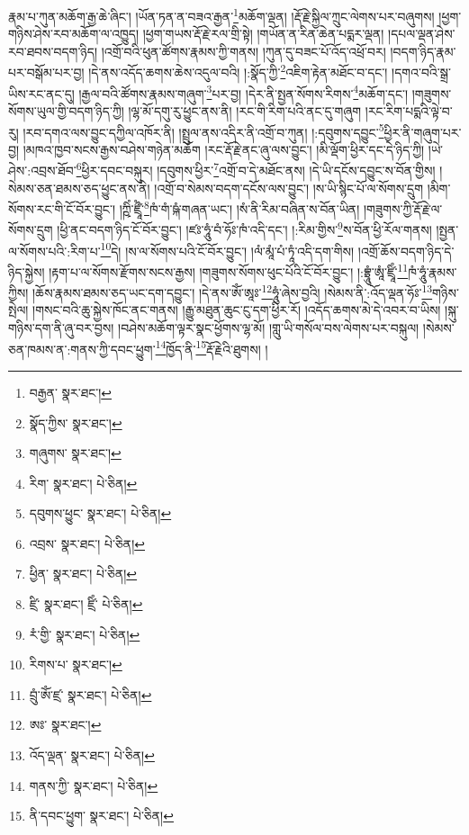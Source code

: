 རྣམ་པ་ཀུན་མཆོག་རྒྱ་ཆེ་ཞིང་། །ཡོན་ཏན་ན་བཟའ་རྒྱན་\footnote{བརྒྱན་  སྣར་ཐང་། }མཆོག་ལྡན། །རྡོ་རྗེ་སྐྱིལ་ཀྲུང་ལེགས་པར་བཞུགས། །ཕྱག་གཉིས་ཤེས་རབ་མཆོག་ལ་འཁྱུད། །ཕྱག་གཡས་རྡོ་རྗེ་རལ་གྲི་སྟེ། །གཡོན་ན་རིན་ཆེན་པདྨར་ལྡན། །དཔལ་ལྡན་ཤེས་རབ་ཐབས་བདག་ཉིད། །འགྲོ་བའི་ཕུན་ཚོགས་རྣམས་ཀྱི་གནས། །ཀུན་དུ་བཟང་པོ་འོད་འཕྲོ་བར། །བདག་ཉིད་རྣམ་པར་བསྒོམ་པར་བྱ། །དེ་ནས་འདོད་ཆགས་ཆེས་འདུལ་བའི། །:སྣོད་ཀྱི་\footnote{སྣོད་ཀྱིས་  སྣར་ཐང་། }འཇིག་རྟེན་མཐོང་བ་དང་། །དགའ་བའི་སྒྲ་ཡིས་རང་ནང་དུ། །རྒྱལ་བའི་ཚོགས་རྣམས་གཞུག་\footnote{གཞུགས་  སྣར་ཐང་། }པར་བྱ། །དེར་ནི་སྤྱན་སོགས་རིགས་\footnote{རིག་  སྣར་ཐང་།  པེ་ཅིན། }མཆོག་དང་། །གཟུགས་སོགས་ཡུལ་གྱི་བདག་ཉིད་ཀྱི། །ལྷ་མོ་དགུ་རུ་ཕྱུང་ནས་ནི། །རང་གི་རིག་པའི་ནང་དུ་གཞུག །རང་རིག་པདྨའི་ལྟེ་བ་རུ། །རབ་དགའ་ལས་བྱུང་དཀྱིལ་འཁོར་ནི། །སྤྲུལ་ནས་འདིར་ནི་འགྲོ་བ་ཀུན། །:དབུགས་དབྱུང་\footnote{དབུགས་ཕྱུང་  སྣར་ཐང་།  པེ་ཅིན། }ཕྱིར་ནི་གཞུག་པར་བྱ། །མཁའ་ཁྱབ་སངས་རྒྱས་བཤེས་གཉེན་མཆོག །རང་རྡོ་རྗེ་ནང་ཞུ་ལས་བྱུང་། །མི་ལྡོག་ཕྱིར་དང་དེ་ཉིད་ཀྱི། །ཡེ་ཤེས་:འབྲས་ཐོབ་\footnote{འབྲས་  སྣར་ཐང་།  པེ་ཅིན། }ཕྱིར་དབང་བསྐུར། །དབུགས་ཕྱིར་\footnote{ཕྱིན་  སྣར་ཐང་།  པེ་ཅིན། }འགྲོ་བ་དེ་མཐོང་ནས། །དེ་ཡི་དངོས་དབྱུང་ས་བོན་གྱིས། །སེམས་ཅན་ཐམས་ཅད་ཕྱུང་ནས་ནི། །འགྲོ་བ་སེམས་བདག་དངོས་ལས་བྱུང་། །ས་ཡི་སྙིང་པོ་ལ་སོགས་དྲུག །མིག་སོགས་རང་གི་ངོ་བོར་བྱུང་། །ཀྵིཾ་ཛྲཱྀཾ་\footnote{ཛྲི་  སྣར་ཐང་། ཛྲིཾ་  པེ་ཅིན། }ཁཾ་གཾ་ཥྐཾ་གཞན་ཡང་། །སཾ་ནི་རིམ་བཞིན་ས་བོན་ཡིན། །གཟུགས་ཀྱི་རྡོ་རྗེ་ལ་སོགས་དྲུག །ཕྱི་ནང་བདག་ཉིད་ངོ་བོར་བྱུང་། །ཛཿ་ཧཱུཾ་བཾ་ཧོཿ་ཁཾ་འདི་དང་། །:རིམ་གྱིས་\footnote{རཾ་གྱི་  སྣར་ཐང་།  པེ་ཅིན། }ས་བོན་ཕྱི་རོལ་གནས། །སྤྱན་ལ་སོགས་པའི་:རིག་པ་\footnote{རིགས་པ་  སྣར་ཐང་། }དེ། །ས་ལ་སོགས་པའི་ངོ་བོར་བྱུང་། །ལཾ་མཱཾ་པཾ་ཏཱཾ་འདི་དག་གིས། །འགྲོ་ཆོས་བདག་ཉིད་དེ་ཉིད་སྐྱེས། །རྟག་པ་ལ་སོགས་རྫོགས་སངས་རྒྱས། །གཟུགས་སོགས་ཕུང་པོའི་ངོ་བོར་བྱུང་། །:བྷྲཱུཾ་ཨཱཾ་ཛྲཱིཾ་\footnote{བྲུཾ་ཨོཾ་ཛྲ་  སྣར་ཐང་།  པེ་ཅིན། }ཁཾ་ཧཱུཾ་རྣམས་ཀྱིས། །ཆོས་རྣམས་ཐམས་ཅད་ཡང་དག་དབྱུང་། །དེ་ནས་ཨོཾ་ཨཱཿ་\footnote{ཨཿ་  སྣར་ཐང་། }ཧཱུཾ་ཞེས་བྱའི། །སེམས་ནི་:འོད་ལྡན་ཧོཿ་\footnote{འོད་ལྡན་  སྣར་ཐང་།  པེ་ཅིན། }གཉིས་སྤེལ། །གསང་བའི་ཆུ་སྐྱེས་ཁོང་ནང་གནས། །རྒྱུ་མཐུན་ཆུང་ངུ་དག་ཕྱིར་རོ། །འདོད་ཆགས་མེ་དེ་འབར་བ་ཡིས། །སྐུ་གཉིས་དག་ནི་ཞུ་བར་བྱས། །བཤེས་མཆོག་ལྟར་སྣང་ཕྱོགས་ལྷ་མོ། །གླུ་ཡི་གསོལ་བས་ལེགས་པར་བསྐུལ། །སེམས་ཅན་ཁམས་ན་:གནས་ཀྱི་དབང་ཕྱུག་\footnote{གནས་ཀྱི་  སྣར་ཐང་།  པེ་ཅིན། }ཁྱོད་ནི་\footnote{ནི་དབང་ཕྱུག་  སྣར་ཐང་།  པེ་ཅིན། }རྡོ་རྗེའི་ཐུགས། །
